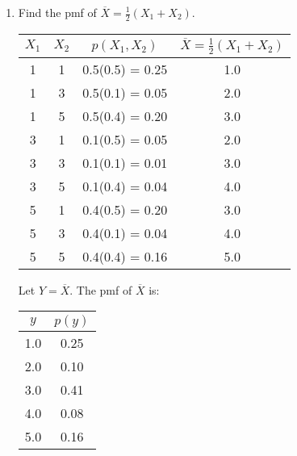     \begin{enumerate}[label=(\alph*)]
        \item Find the pmf of $\overline{X} = \frac{1}{2}(X_{1} + X_{2})$.
        \\
        \begin{mdframed}
            \begin{multicols}{2}
                \begin{center}
                    \begin{tabular}{c | c | c | c}
                        $X_{1}$ & $X_{2}$ & $p(X_{1}, X_{2})$ & $\overline{X} = \frac{1}{2}(X_{1}+X_{2})$\\
                        \hline
                        1 & 1 & 0.5(0.5) = 0.25 & 1.0            \\
                        1 & 3 & 0.5(0.1) = 0.05 & 2.0            \\
                        1 & 5 & 0.5(0.4) = 0.20 & 3.0            \\
                        \hline                      
                        3 & 1 & 0.1(0.5) = 0.05 & 2.0            \\
                        3 & 3 & 0.1(0.1) = 0.01 & 3.0            \\
                        3 & 5 & 0.1(0.4) = 0.04 & 4.0            \\
                        \hline
                        5 & 1 & 0.4(0.5) = 0.20 & 3.0            \\
                        5 & 3 & 0.4(0.1) = 0.04 & 4.0            \\
                        5 & 5 & 0.4(0.4) = 0.16 & 5.0            \\
                    \end{tabular}
                \end{center}

                \columnbreak

                Let $Y = \overline{X}$. The pmf of $\overline{X}$ is:

                \begin{center}
                    \begin{tabular}{c | c}
                        $y$ & $p(y)$        \\
                        \hline                
                        1.0 & 0.25  \\
                        2.0 & 0.10  \\
                        3.0 & 0.41  \\
                        4.0 & 0.08  \\
                        5.0 & 0.16  \\       
                    \end{tabular}
                \end{center}


\end{multicols}
\end{mdframed}
\end{enumerate}
